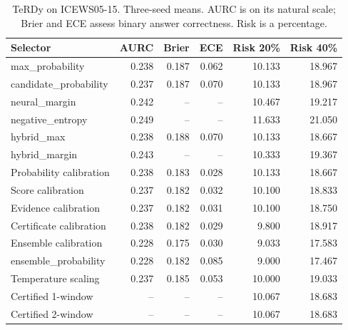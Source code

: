 \begin{table}[H]\centering\small\caption{TeRDy on ICEWS05-15. Three-seed means. AURC is on its natural scale; Brier and ECE assess binary answer correctness. Risk is a percentage.}\begin{tabular}{lrrrrr}\toprule Selector & AURC & Brier & ECE & Risk 20\% & Risk 40\%\\\midrule
max\_probability & 0.238 & 0.187 & 0.062 & 10.133 & 18.967\\
candidate\_probability & 0.237 & 0.187 & 0.070 & 10.133 & 18.967\\
neural\_margin & 0.242 & -- & -- & 10.467 & 19.217\\
negative\_entropy & 0.249 & -- & -- & 11.633 & 21.050\\
hybrid\_max & 0.238 & 0.188 & 0.070 & 10.133 & 18.667\\
hybrid\_margin & 0.243 & -- & -- & 10.333 & 19.367\\
Probability calibration & 0.238 & 0.183 & 0.028 & 10.133 & 18.667\\
Score calibration & 0.237 & 0.182 & 0.032 & 10.100 & 18.833\\
Evidence calibration & 0.237 & 0.182 & 0.031 & 10.100 & 18.750\\
Certificate calibration & 0.238 & 0.182 & 0.029 & 9.800 & 18.917\\
Ensemble calibration & 0.228 & 0.175 & 0.030 & 9.033 & 17.583\\
ensemble\_probability & 0.228 & 0.182 & 0.085 & 9.000 & 17.467\\
Temperature scaling & 0.237 & 0.185 & 0.053 & 10.000 & 19.033\\
Certified 1-window & -- & -- & -- & 10.067 & 18.683\\
Certified 2-window & -- & -- & -- & 10.067 & 18.683\\
\bottomrule\end{tabular}\end{table}
